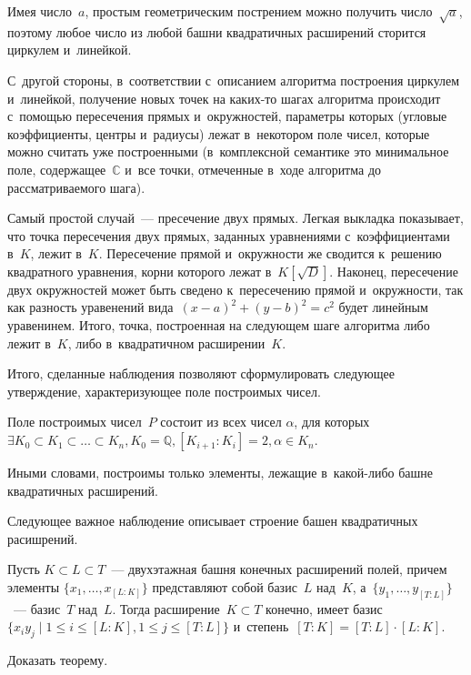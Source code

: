 \documentclass{article}
\begin{document}
Имея число~$a$, простым геометрическим пострением можно получить
число~$\sqrt{a}$, поэтому любое число из любой башни квадратичных расширений
сторится циркулем и~линейкой.

С~другой стороны, в~соответствии с~описанием алгоритма построения циркулем
и~линейкой, получение новых точек на каких-то шагах алгоритма происходит
с~помощью пересечения прямых и~окружностей, параметры которых (угловые
коэффициенты, центры и~радиусы) лежат в~некотором поле чисел, которые можно
считать уже построенными (в~комплексной семантике это минимальное поле,
содержащее~$\mathbb{C}$ и~все точки, отмеченные в~ходе алгоритма до
рассматриваемого шага).

Самый простой случай~--- пресечение двух прямых. Легкая выкладка показывает, что
точка пересечения двух прямых, заданных уравнениями с~коэффициентами в~$K$,
лежит в~$K$. Пересечение прямой и~окружности же сводится к~решению квадратного
уравнения, корни которого лежат в~$K[\sqrt{D}]$. Наконец, пересечение двух
окружностей может быть сведено к~пересечению прямой и~окружности, так как
разность уравенений вида~$(x-a)^2 + (y-b)^2 = c^2$ будет линейным уравенинем.
Итого, точка, построенная на следующем шаге алгоритма либо лежит в~$K$, либо
в~квадратичном расширении~$K$.

Итого, сделанные наблюдения позволяют сформулировать следующее утверждение,
характеризующее поле построимых чисел.

\begin{claim}
  Поле построимых чисел~$P$ состоит из всех чисел $\alpha$, для которых $\exists
  K_0 \subset K_1 \subset \ldots \subset K_n, K_0 = \mathbb{Q}, [K_{i+1}:K_i] =
  2, \alpha \in K_n$.

  Иными словами, построимы только элементы, лежащие в~какой-либо башне
  квадратичных расширений.
\end{claim}

Следующее важное наблюдение описывает строение башен квадратичных расишрений.

\begin{theorem}
  Пусть $K \subset L \subset T$~--- двухэтажная башня конечных расширений полей,
  причем элементы $\{x_1, \ldots, x_{[L:K]}\}$ представляют собой базис~$L$
  над~$K$, а~$\{y_1, \ldots, y_{[T:L]} \}$~--- базис~$T$ над~$L$. Тогда
  расширение~$K \subset T$ конечно, имеет базис~$\{x_i y_j \mid 1 \le i \le
  [L:K], 1 \le j \le [T:L]\}$ и~степень~$[T:K] = [T:L] \cdot [L:K]$.
\end{theorem}

\begin{exercise}
  Доказать теорему.
\end{exercise}
\end{document}
